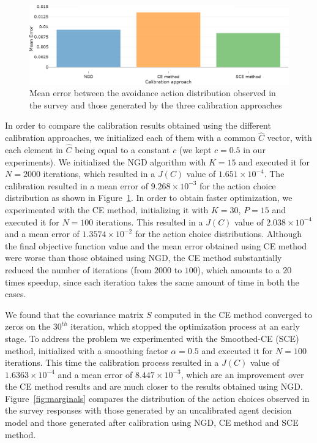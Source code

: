 \documentclass[doublespace]{VTthesis}
\begin{document}
    \begin{figure}
    \centering
    \includegraphics[width=\textwidth]{figures/meanerrors.png}
    \caption{Mean error between the avoidance action distribution observed in the survey and those generated by the three calibration approaches}
    \label{fig:mean-errors}
    \vspace{-0.1in}
    \end{figure}
    
    In order to compare the calibration results obtained using the different calibration approaches, we initialized each of them with a common $\hat{C}$ vector, with each element in $\hat{C}$ being equal to a constant $c$ (we kept $c=0.5$ in our experiments). We initialized the NGD algorithm with $K=15$ and executed it for $N=2000$ iterations, which resulted in a $J(C)$ value of $1.651 \times 10^{-4}$. The calibration resulted in a mean error of $9.268 \times 10^{-3}$ for the action choice distribution as shown in Figure~\ref{fig:mean-errors}. In order to obtain faster optimization, we experimented with the CE method, initializing it with $K=30$, $P=15$ and executed it for $N=100$ iterations. This resulted in a $J(C)$ value of $2.038 \times 10^{-4}$ and a mean error of $1.3574 \times 10^{-2}$ for the action choice distributions. Although the final objective function value and the mean error obtained using CE method were worse than those obtained using NGD, the CE method substantially reduced the number of iterations (from $2000$ to $100$), which amounts to a $20$ times speedup, since each iteration takes the same amount of time in both the cases. 
    
    We found that the covariance matrix $S$ computed in the CE method converged to zeros on the $30^{th}$ iteration, which stopped the optimization process at an early stage. To address the problem we experimented with the Smoothed-CE (SCE) method, initialized with a smoothing factor $\alpha = 0.5$ and executed it for $N=100$ iterations. This time the calibration process resulted in a $J(C)$ value of $1.6363 \times 10^{-4}$ and a mean error of $8.447 \times 10^{-3}$, which are an improvement over the CE method results and are much closer to the results obtained using NGD. Figure~\ref{fig:marginals} compares the distribution of the action choices observed in the survey responses with those generated by an uncalibrated agent decision model and those generated after calibration using NGD, CE method and SCE method.
    
\end{document}
